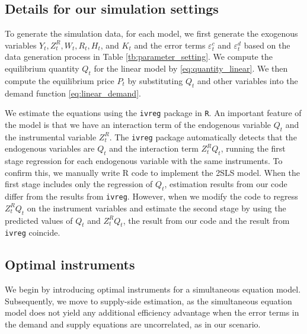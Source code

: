 \documentclass[11pt, a4paper]{article}
\begin{document}
\subsection{Details for our simulation settings}

To generate the simulation data, for each model, we first generate the exogenous variables $Y_{t}, Z^{R}_{t}, W_{t}, R_{t}, H_{t}$, and $K_{t}$ and the error terms $\varepsilon_{t}^c$ and $\varepsilon_{t}^d$ based on the data generation process in Table \ref{tb:parameter_setting}.
We compute the equilibrium quantity $Q_{t}$ for the linear model by \eqref{eq:quantity_linear}.
We then compute the equilibrium price $P_{t}$ by substituting $Q_{t}$ and other variables into the demand function \eqref{eq:linear_demand}.

We estimate the equations using the \texttt{ivreg} package in \texttt{R}.
An important feature of the model is that we have an interaction term of the endogenous variable $Q_{t}$ and the instrumental variable $Z^{R}_{t}$.
The \texttt{ivreg} package automatically detects that the endogenous variables are $Q_{t}$ and the interaction term $Z^{R}_{t}Q_{t}$, running the first stage regression for each endogenous variable with the same instruments. To confirm this, we manually write R code to implement the 2SLS model. 
When the first stage includes only the regression of $Q_{t}$, estimation results from our code differ from the results from \texttt{ivreg}. 
However, when we modify the code to regress $Z^{R}_{t}Q_{t}$ on the instrument variables and estimate the second stage by using the predicted values of $Q_{t}$ and $Z^{R}_{t}Q_{t}$, the result from our code and the result from \texttt{ivreg} coincide.





\subsection{Optimal instruments}\label{sec:optimal_instruments}
We begin by introducing optimal instruments for a simultaneous equation model. Subsequently, we move to supply-side estimation, as the simultaneous equation model does not yield any additional efficiency advantage when the error terms in the demand and supply equations are uncorrelated, as in our scenario.
\end{document}

